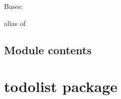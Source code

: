 \documentclass[letterpaper,10pt,english]{sphinxmanual}
\begin{document}
\begin{fulllineitems}
\label{\detokenize{todo:todo.views.TaskListView}}
\pysigstartsignatures
{}
\pysigstopsignatures
\sphinxAtStartPar
Bases: 

\begin{fulllineitems}
\label{\detokenize{todo:todo.views.TaskListView.context_object_name}}
\pysigstartsignatures
{}
\pysigstopsignatures
\end{fulllineitems}


\begin{fulllineitems}
\label{\detokenize{todo:todo.views.TaskListView.model}}
\pysigstartsignatures
{}
\pysigstopsignatures
\sphinxAtStartPar
alias of {\hyperref[\detokenize{todo:todo.models.Task}]{}}

\end{fulllineitems}


\end{fulllineitems}



\section{Module contents}
\label{\detokenize{todo:module-todo}}\label{\detokenize{todo:module-contents}}
\sphinxstepscope


\chapter{todolist package}
\label{\detokenize{todolist:todolist-package}}\label{\detokenize{todolist::doc}}
\end{document}
